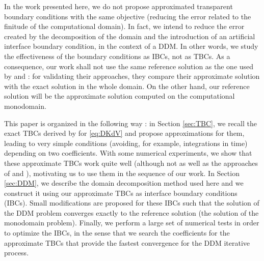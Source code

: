 \indent In the work presented here, we do not propose approximated transparent boundary conditions with the same objective (reducing the error related to the finitude of the computational domain). In fact, we intend to reduce the error created by the decomposition of the domain and the introduction of an artificial interface boundary condition, in the context of a DDM. In other words, we study the effectiveness of the boundary conditions as IBCs, not as TBCs. As a consequence, our work shall not use the same reference solution as the one used by \cite{zheng2008} and \cite{besse2015} : for validating their approaches, they compare their approximate solution with the exact solution in the whole domain. On the other hand, our reference solution will be the approximate solution computed on the computational monodomain.

\indent This paper is organized in the following way : in Section \ref{sec:TBC}, we recall the exact TBCs derived by \cite{zheng2008} for \eqref{eq:DKdV} and propose approximations for them, leading to very simple conditions (avoiding, for example, integrations in time) depending on two coefficients. With some numerical experiments, we show that these approximate TBCs work quite well (although not as well as the approaches of \cite{zheng2008} and \cite{besse2015}), motivating us to use them in the sequence of our work. In Section \ref{sec:DDM}, we describe the domain decomposition method used here and we construct it using our approximate TBCs as interface boundary conditions (IBCs). Small modifications are proposed for these IBCs such that the solution of the DDM problem converges exactly to the reference solution (the solution of the monodomain problem). Finally, we perform a large set of numerical tests in order to optimize the IBCs, in the sense that we search the coefficients for the approximate TBCs that provide the fastest convergence for the DDM iterative process.
